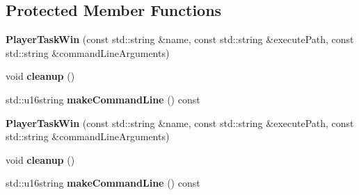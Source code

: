 \subsection*{Protected Member Functions}
\begin{DoxyCompactItemize}
\item 
\mbox{\label{classPlayerTaskWin_abea0fcb8d2a6577f8d8e9d621c52f530}} 
{\bfseries Player\+Task\+Win} (const std\+::string \&name, const std\+::string \&execute\+Path, const std\+::string \&command\+Line\+Arguments)
\item 
\mbox{\label{classPlayerTaskWin_ad0a41ebaeda5115c74bfdddf7fc0432d}} 
void {\bfseries cleanup} ()
\item 
\mbox{\label{classPlayerTaskWin_afc8e99b691bd663e9c9cc9b5d6fd0d58}} 
std\+::u16string {\bfseries make\+Command\+Line} () const
\item 
\mbox{\label{classPlayerTaskWin_abea0fcb8d2a6577f8d8e9d621c52f530}} 
{\bfseries Player\+Task\+Win} (const std\+::string \&name, const std\+::string \&execute\+Path, const std\+::string \&command\+Line\+Arguments)
\item 
\mbox{\label{classPlayerTaskWin_ad0a41ebaeda5115c74bfdddf7fc0432d}} 
void {\bfseries cleanup} ()
\item 
\mbox{\label{classPlayerTaskWin_afc8e99b691bd663e9c9cc9b5d6fd0d58}} 
std\+::u16string {\bfseries make\+Command\+Line} () const
\end{DoxyCompactItemize}

